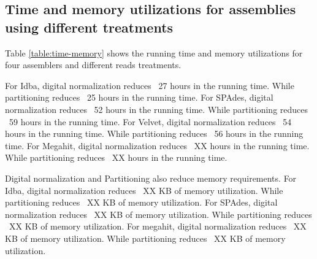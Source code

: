 
\subsection*{Time and memory utilizations for assemblies using different treatments}
Table \ref {table:time-memory}  shows the  running time and memory utilizations for four assemblers and different reads treatments.
 
For Idba, digital normalization reduces ~27 hours in the running time. While partitioning  reduces ~25 hours in the running time. 
For SPAdes, digital normalization reduces ~52 hours in the running time. While partitioning  reduces ~59 hours in the running time. 
For Velvet, digital normalization reduces ~54 hours in the running time. While partitioning  reduces ~56 hours in the running time. 
For Megahit, digital normalization reduces ~XX hours in the running time. While partitioning  reduces ~XX hours in the running time. 

Digital normalization and Partitioning also reduce memory requirements. For Idba, digital normalization reduces ~XX KB of memory utilization. While partitioning reduces ~XX KB of memory utilization.
For SPAdes, digital normalization reduces ~XX KB of memory utilization. While partitioning reduces ~XX KB of memory utilization.
For megahit, digital normalization reduces ~XX KB of memory utilization. While partitioning reduces ~XX KB of memory utilization.


